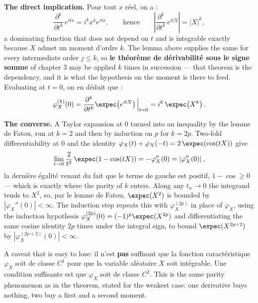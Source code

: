 \begin{remark}
\textbf{The direct implication.} Pour tout $x$ réel, on a :
\[
  \frac{\partial^{k}}{\partial t^{k}}\,e^{itx} = i^{k}x^{k}e^{itx}, \qquad\text{hence}\qquad
  \left|\frac{\partial^{k}}{\partial t^{k}}\,e^{itX}\right| = |X|^{k},
\]
a dominating function that does not depend on $t$ and is integrable exactly because $X$
admet un moment d'ordre $k$. The lemma above supplies the same for every intermediate order
$j \leq k$, so \textbf{le théorème de dérivabilité sous le signe somme} of chapter 3 may
be applied $k$ times in succession --- that theorem is the dependency, and it is what the
hypothesis on the moment is there to feed. Evaluating at $t = 0$, on en déduit que :
\[
  \varphi_{X}^{(k)}(0) = \frac{\partial^{k}}{\partial
  t^{k}}\expec\!\left(e^{itX}\right)\Big|_{t=0} = i^{k}\,\expec\!\left(X^{k}\right).
\]
\end{remark}

\begin{remark}
\textbf{The converse.} A Taylor expansion at $0$ turned into an inequality by the lemme de
Fatou, run at $k = 2$ and then by induction on $p$ for $k = 2p$. Two-fold
differentiability at $0$ and the identity
$\varphi_{X}(t) + \varphi_{X}(-t) = 2\,\expec\!\left(\cos(tX)\right)$ give
\[
  \lim_{t \to 0} \frac{2}{t^{2}}\,\expec\!\left(1 - \cos(tX)\right) = -\varphi_{X}''(0) =
  \left|\varphi_{X}''(0)\right|,
\]
la dernière égalité venant du fait que le terme de gauche est positif, $1 - \cos \geq 0$ ---
which is exactly where the parity of $k$ enters. Along any $t_{n} \to 0$ the integrand tends
to $X^{2}$, so, par le lemme de Fatou, $\expec(X^{2})$ is bounded by
$\left|\varphi_{X}''(0)\right| < \infty$. The
induction step repeats this with $\varphi_{X}^{(2p)}$ in place of $\varphi_{X}$, using the
induction hypothesis $\varphi_{X}^{(2p)}(0) = (-1)^{p}\expec(X^{2p})$ and differentiating
the same cosine identity $2p$ times under the integral sign, to bound
$\expec(X^{2p+2})$ by $\left|\varphi_{X}^{(2p+2)}(0)\right| < \infty$.
\end{remark}

\begin{remark}
A caveat that is easy to lose: il n'est \textbf{pas} suffisant que la fonction
caractéristique $\varphi_{X}$ soit de classe $C^{1}$ pour que la variable aléatoire $X$ soit
intégrable. Une condition suffisante est que $\varphi_{X}$ soit de classe $C^{2}$. This is the
same parity phenomenon as in the theorem, stated for the weakest case: one derivative buys
nothing, two buy a first and a second moment.
\end{remark}


